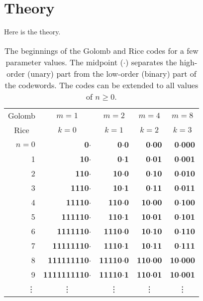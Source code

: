 \chapter{Theory}\label{ch:theory}
Here is the theory.

\begin{table}[]
\centering
\caption{The beginnings of the Golomb and Rice codes for a few parameter values. The midpoint ($\cdot$) separates the high-order (unary) part from the low-order (binary) part of the codewords. The codes can be extended to all values of $n\geq0$.}
\label{my-label}
\begin{tabular}{rrrrr}
\multicolumn{1}{c}{Golomb}   & \multicolumn{1}{c}{$m=1$}   & \multicolumn{1}{c}{$m=2$}   & \multicolumn{1}{c}{$m=4$}   & \multicolumn{1}{c}{$m=8$}   \\
\multicolumn{1}{c}{Rice}     & \multicolumn{1}{c}{$k=0$}   & \multicolumn{1}{c}{$k=1$}   & \multicolumn{1}{c}{$k=2$}   & \multicolumn{1}{c}{$k=3$}   \\
\hline %
\multicolumn{1}{r|}{$n=0$}   & \textbf{0$\cdot$}           & \textbf{0$\cdot$0}          & \textbf{0$\cdot$00}         & \textbf{0$\cdot$000}        \\
\multicolumn{1}{r|}{      1} & \textbf{10$\cdot$}          & \textbf{0$\cdot$1}          & \textbf{0$\cdot$01}         & \textbf{0$\cdot$001}        \\
\multicolumn{1}{r|}{      2} & \textbf{110$\cdot$}         & \textbf{10$\cdot$0}         & \textbf{0$\cdot$10}         & \textbf{0$\cdot$010}        \\
\multicolumn{1}{r|}{      3} & \textbf{1110$\cdot$}        & \textbf{10$\cdot$1}         & \textbf{0$\cdot$11}         & \textbf{0$\cdot$011}        \\
\multicolumn{1}{r|}{      4} & \textbf{11110$\cdot$}       & \textbf{110$\cdot$0}        & \textbf{10$\cdot$00}        & \textbf{0$\cdot$100}        \\
\multicolumn{1}{r|}{      5} & \textbf{111110$\cdot$}      & \textbf{110$\cdot$1}        & \textbf{10$\cdot$01}        & \textbf{0$\cdot$101}        \\
\multicolumn{1}{r|}{      6} & \textbf{1111110$\cdot$}     & \textbf{1110$\cdot$0}       & \textbf{10$\cdot$10}        & \textbf{0$\cdot$110}        \\
\multicolumn{1}{r|}{      7} & \textbf{11111110$\cdot$}    & \textbf{1110$\cdot$1}       & \textbf{10$\cdot$11}        & \textbf{0$\cdot$111}        \\
\multicolumn{1}{r|}{      8} & \textbf{111111110$\cdot$}   & \textbf{11110$\cdot$0}      & \textbf{110$\cdot$00}       & \textbf{10$\cdot$000}       \\
\multicolumn{1}{r|}{      9} & \textbf{1111111110$\cdot$}  & \textbf{11110$\cdot$1}      & \textbf{110$\cdot$01}       & \textbf{10$\cdot$001}       \\
\multicolumn{1}{r|}{ \vdots} & \multicolumn{1}{c}{\vdots}  & \multicolumn{1}{c}{\vdots}  & \multicolumn{1}{c}{\vdots}  & \multicolumn{1}{c}{\vdots} 
\end{tabular}
\end{table}

